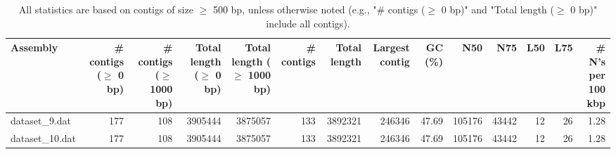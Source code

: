 \documentclass[12pt,a4paper]{article}
\begin{document}
\begin{table}[ht]
\begin{center}
\caption{All statistics are based on contigs of size $\geq$ 500 bp, unless otherwise noted (e.g., "\# contigs ($\geq$ 0 bp)" and "Total length ($\geq$ 0 bp)" include all contigs).}
\begin{tabular}{|l*{13}{|r}|}
\hline
Assembly & \# contigs ($\geq$ 0 bp) & \# contigs ($\geq$ 1000 bp) & Total length ($\geq$ 0 bp) & Total length ($\geq$ 1000 bp) & \# contigs & Total length & Largest contig & GC (\%) & N50 & N75 & L50 & L75 & \# N's per 100 kbp \\ \hline
dataset\_9.dat & 177 & 108 & 3905444 & 3875057 & 133 & 3892321 & 246346 & 47.69 & 105176 & 43442 & 12 & 26 & 1.28 \\ \hline
dataset\_10.dat & 177 & 108 & 3905444 & 3875057 & 133 & 3892321 & 246346 & 47.69 & 105176 & 43442 & 12 & 26 & 1.28 \\ \hline
\end{tabular}
\end{center}
\end{table}
\end{document}
